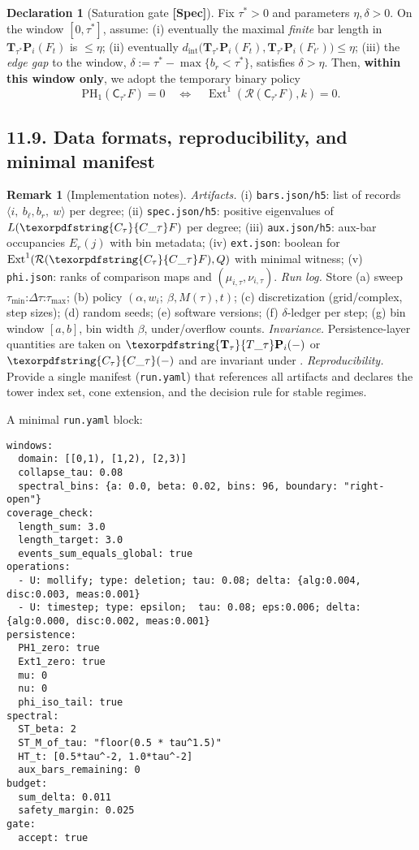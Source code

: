 \documentclass[11pt]{article}
\DeclareMathOperator{\Ext}{Ext}
\newcommand{\C}{\mathsf{C}}
\newcommand{\Rfun}{\mathcal{R}}
\numberwithin{equation}{section}
\theoremstyle{definition}
\newtheorem{remark}[theorem]{Remark}
\newtheorem{declaration}[theorem]{Declaration}
\DeclareRobustCommand{\Ttau}{\texorpdfstring{\ensuremath{\mathbf{T}_{\tau}}}{T\_\tau}}
\DeclareRobustCommand{\Ctau}{\texorpdfstring{\ensuremath{C_{\tau}}}{C\_\tau}}
\DeclareRobustCommand{\fqi}{\text{f.q.i.}}
\begin{document}
\begin{declaration}[Saturation gate \textbf{[Spec]}]\label{gate:11-saturation}
Fix $\tau^\ast>0$ and parameters $\eta,\delta>0$. On the window $[0,\tau^\ast]$, assume:
(i) eventually the maximal \emph{finite} bar length in $\mathbf{T}_{\tau^\ast}\mathbf{P}_i(F_t)$ is $\le \eta$;
(ii) eventually $d_{\mathrm{int}}\!\big(\mathbf{T}_{\tau^\ast}\mathbf{P}_i(F_t),\mathbf{T}_{\tau^\ast}\mathbf{P}_i(F_{t'})\big)\le \eta$;
(iii) the \emph{edge gap} to the window, $\delta:=\tau^\ast-\max\{b_r<\tau^\ast\}$, satisfies $\delta>\eta$.
Then, \textbf{within this window only}, we adopt the temporary binary policy
\[
\mathrm{PH}_1(\C_{\tau^\ast}F)=0\quad\Longleftrightarrow\quad \Ext^1(\Rfun(\C_{\tau^\ast}F),k)=0.
\]
\end{declaration}

\subsection*{11.9. Data formats, reproducibility, and minimal manifest}
\begin{remark}[Implementation notes]\label{rk:11-impl}
\emph{Artifacts.} (i) \texttt{bars.json/h5}: list of records $\langle i,\ b_{\ell},b_{r},\ w\rangle$ per degree; (ii) \texttt{spec.json/h5}: positive eigenvalues of $L(\Ctau F)$ per degree; (iii) \texttt{aux.json/h5}: aux-bar occupancies $E_r(j)$ with bin metadata; (iv) \texttt{ext.json}: boolean for $\Ext^1(\Rfun(\Ctau F),Q)$ with minimal witness; (v) \texttt{phi.json}: ranks of comparison maps and $(\mu_{i,\tau},\nu_{i,\tau})$. \emph{Run log.} Store (a) sweep $\tau_{\min}$:$\Delta\tau$:$\tau_{\max}$; (b) policy $(\alpha, w_i;\ \beta,M(\tau),t)$; (c) discretization (grid/complex, step sizes); (d) random seeds; (e) software versions; (f) $\delta$-ledger per step; (g) bin window $[a,b]$, bin width $\beta$, under/overflow counts. \emph{Invariance.} Persistence-layer quantities are taken on $\Ttau\mathbf{P}_i(-)$ or $\Ctau(-)$ and are invariant under \fqi. \emph{Reproducibility.} Provide a single manifest (\texttt{run.yaml}) that references all artifacts and declares the tower index set, cone extension, and the decision rule for stable regimes.
\end{remark}

\noindent A minimal \texttt{run.yaml} block:

\begin{verbatim}
windows:
  domain: [[0,1), [1,2), [2,3)]
  collapse_tau: 0.08
  spectral_bins: {a: 0.0, beta: 0.02, bins: 96, boundary: "right-open"}
coverage_check:
  length_sum: 3.0
  length_target: 3.0
  events_sum_equals_global: true
operations:
  - U: mollify; type: deletion; tau: 0.08; delta: {alg:0.004, disc:0.003, meas:0.001}
  - U: timestep; type: epsilon;  tau: 0.08; eps:0.006; delta: {alg:0.000, disc:0.002, meas:0.001}
persistence:
  PH1_zero: true
  Ext1_zero: true
  mu: 0
  nu: 0
  phi_iso_tail: true
spectral:
  ST_beta: 2
  ST_M_of_tau: "floor(0.5 * tau^1.5)"
  HT_t: [0.5*tau^-2, 1.0*tau^-2]
  aux_bars_remaining: 0
budget:
  sum_delta: 0.011
  safety_margin: 0.025
gate:
  accept: true
\end{verbatim}
\end{document}
